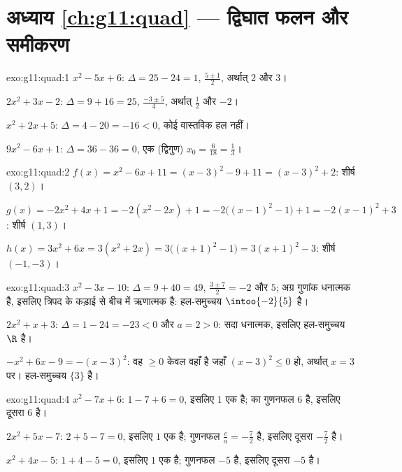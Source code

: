 \section*{अध्याय \ref{ch:g11:quad} --- द्विघात फलन और समीकरण}

\begin{solution}{exo:g11:quad:1}
$x^2-5x+6$: $\Delta = 25 - 24 = 1$,  $\frac{5 \pm 1}{2}$, अर्थात् $2$ और $3$।

$2x^2+3x-2$: $\Delta = 9 + 16 = 25$,  $\frac{-3 \pm 5}{4}$, अर्थात् $\frac12$ और $-2$।

$x^2+2x+5$: $\Delta = 4 - 20 = -16 < 0$, कोई वास्तविक हल नहीं।

$9x^2-6x+1$: $\Delta = 36 - 36 = 0$, एक (द्विगुण)  $x_0 = \frac{6}{18} = \frac13$।
\end{solution}

\begin{solution}{exo:g11:quad:2}
$f(x) = x^2 - 6x + 11 = (x-3)^2 - 9 + 11 = (x-3)^2 + 2$: शीर्ष $(3, 2)$।

$g(x) = -2x^2+4x+1 = -2(x^2 - 2x) + 1 = -2\bigl((x-1)^2 - 1\bigr) + 1
= -2(x-1)^2 + 3$: शीर्ष $(1, 3)$।

$h(x) = 3x^2 + 6x = 3(x^2 + 2x) = 3\bigl((x+1)^2 - 1\bigr)
= 3(x+1)^2 - 3$: शीर्ष $(-1, -3)$।
\end{solution}

\begin{solution}{exo:g11:quad:3}
$x^2 - 3x - 10$: $\Delta = 9 + 40 = 49$,  $\frac{3 \pm 7}{2} = -2$ और $5$; अग्र गुणांक धनात्मक है, इसलिए त्रिपद  के
कड़ाई से बीच में ऋणात्मक है: हल-समुच्चय $\intoo{-2}{5}$ है।

$2x^2 + x + 3$: $\Delta = 1 - 24 = -23 < 0$ और $a = 2 > 0$: सदा धनात्मक, इसलिए हल-समुच्चय $\R$ है।

$-x^2 + 6x - 9 = -(x-3)^2$: वह $\geq 0$ केवल वहाँ है जहाँ $(x-3)^2 \leq 0$ हो, अर्थात् $x = 3$ पर। हल-समुच्चय $\{3\}$
है।
\end{solution}

\begin{solution}{exo:g11:quad:4}
$x^2 - 7x + 6$: $1 - 7 + 6 = 0$, इसलिए $1$ एक  है;  का गुणनफल $6$ है, इसलिए दूसरा 
$6$ है।

$2x^2 + 5x - 7$: $2 + 5 - 7 = 0$, इसलिए $1$ एक  है; गुणनफल $\frac{c}{a} = -\frac72$ है, इसलिए दूसरा  $-\frac72$ है।

$x^2 + 4x - 5$: $1 + 4 - 5 = 0$, इसलिए $1$ एक  है; गुणनफल $-5$ है, इसलिए दूसरा  $-5$ है।
\end{solution}

